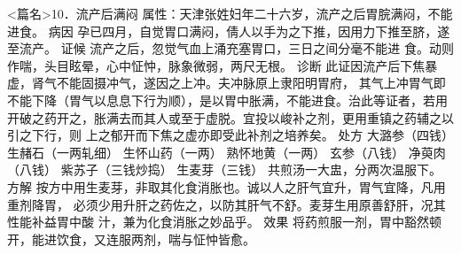 \documentclass[a4paper,12pt,UTF8,twoside]{ctexbook}
\begin{document}
<篇名>10．流产后满闷
属性：天津张姓妇年二十六岁，流产之后胃脘满闷，不能进食。 
病因 孕已四月，自觉胃口满闷，倩人以手为之下推，因用力下推至脐，遂至流产。 
证候 流产之后，忽觉气血上涌充塞胃口，三日之间分毫不能进 
食。动则作喘，头目眩晕，心中怔忡，脉象微弱，两尺无根。 
诊断 此证因流产后下焦暴虚，肾气不能固摄冲气，遂因之上冲。夫冲脉原上隶阳明胃府， 
其气上冲胃气即不能下降（胃气以息息下行为顺），是以胃中胀满，不能进食。治此等证者，若用 
开破之药开之，胀满去而其人或至于虚脱。宜投以峻补之剂，更用重镇之药辅之以引之下行，则 
上之郁开而下焦之虚亦即受此补剂之培养矣。 
处方 大潞参（四钱） 生赭石（一两轧细） 生怀山药（一两） 熟怀地黄（一两） 
玄参（八钱） 净萸肉（八钱） 紫苏子（三钱炒捣） 生麦芽（三钱） 
共煎汤一大盅，分两次温服下。 
方解 按方中用生麦芽，非取其化食消胀也。诚以人之肝气宜升，胃气宜降，凡用重剂降胃， 
必须少用升肝之药佐之，以防其肝气不舒。麦芽生用原善舒肝，况其性能补益胃中酸 
汁，兼为化食消胀之妙品乎。 
效果 将药煎服一剂，胃中豁然顿开，能进饮食，又连服两剂，喘与怔忡皆愈。 
\end{document}
